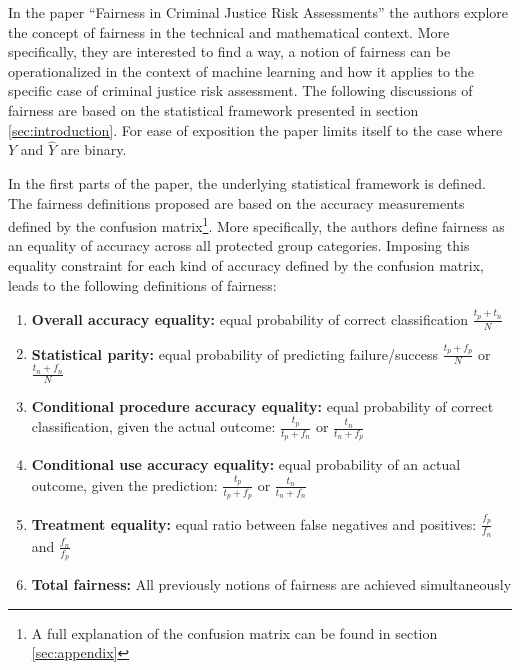 In the paper \enquote{Fairness in Criminal Justice Risk Assessments} \cite{Berk.2018} 
the authors explore the concept of fairness in the technical and mathematical context. 
More specifically, they are interested to find a way, a notion of fairness can be 
operationalized in the context of machine learning and how it applies to the specific
case of criminal justice risk assessment. The following discussions of fairness are based 
on the statistical framework presented in section \ref{sec:introduction}. For ease of 
exposition the paper limits itself to the case where $Y$ and $\hat{Y}$ are binary.


In the first parts of the paper, the underlying statistical framework is defined. The 
fairness definitions proposed are based on the accuracy measurements defined by the 
confusion matrix\footnote{ A full explanation of the confusion matrix can be found in 
section \ref{sec:appendix}}. More specifically, the authors define fairness as an equality 
of accuracy across all protected group categories. Imposing this equality constraint for 
each kind of accuracy defined by the confusion matrix, leads to the following definitions 
of fairness: 

\begin{enumerate}
    \item \textbf{Overall accuracy equality:} equal probability of correct classification 
    $\frac{t_p + t_n}{N}$ 
    \item \textbf{Statistical parity:} equal probability of predicting failure/success 
    $\frac{t_p + f_p}{N}$ or $\frac{t_n + f_n}{N}$
    \item \textbf{Conditional procedure accuracy equality:} equal probability of correct 
    classification, given the actual outcome: $\frac{t_p}{t_p + f_n}$ or 
    $\frac{t_n}{t_n + f_p}$
    \item \textbf{Conditional use accuracy equality:} equal probability of an actual 
    outcome, given the prediction: $\frac{t_p}{t_p + f_p}$ or $\frac{t_n}{t_n + f_n}$
    \item \textbf{Treatment equality:} equal ratio between false negatives and positives: 
    $\frac{f_p}{f_n}$ and $\frac{f_n}{f_p}$
    \item \textbf{Total fairness:} All previously notions of fairness are achieved 
    simultaneously
\end{enumerate}

